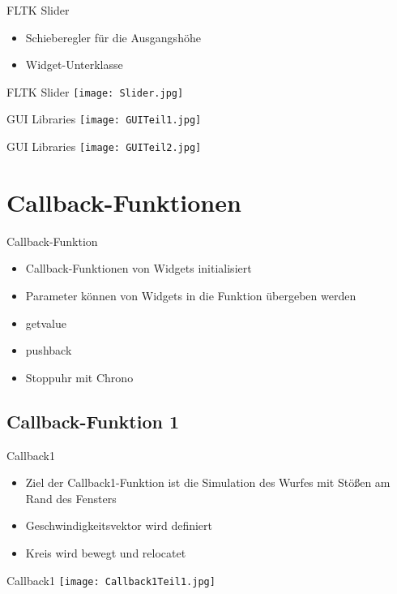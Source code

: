 \documentclass{beamer}
\begin{document}
\begin{frame}{FLTK Slider}
\begin{itemize}
\item Schieberegler für die Ausgangshöhe
\item Widget-Unterklasse
\end{itemize}
\end{frame}

\begin{frame}{FLTK Slider}
\texttt{[image: Slider.jpg]} 
\end{frame}

\begin{frame}{GUI Libraries}
\texttt{[image: GUITeil1.jpg]} 
\end{frame}

\begin{frame}{GUI Libraries}
\texttt{[image: GUITeil2.jpg]} 
\end{frame}

\section{Callback-Funktionen}
\begin{frame}{Callback-Funktion}
\begin{itemize}
\item Callback-Funktionen von Widgets initialisiert
\item Parameter können von Widgets in die Funktion übergeben werden
\item get\textunderscore value
\item push\textunderscore back
\item Stoppuhr mit Chrono
\end{itemize}
\end{frame}

\subsection{Callback-Funktion 1}
\begin{frame}{Callback1}
\begin{itemize}
\item Ziel der Callback1-Funktion ist die Simulation des
Wurfes mit Stößen am Rand des Fensters
\item Geschwindigkeitsvektor wird definiert
\item Kreis wird bewegt und relocatet
\end{itemize}
\end{frame}
\begin{frame}{Callback1}
\texttt{[image: Callback1Teil1.jpg]} 
\end{frame}
\end{document}
